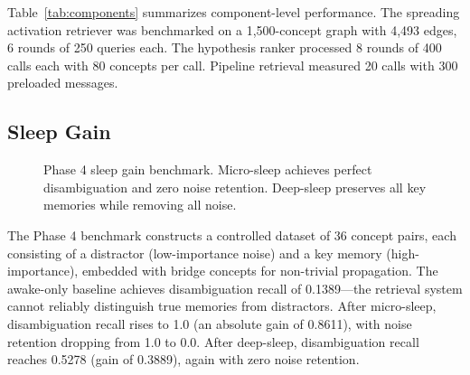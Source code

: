 \documentclass[11pt,twocolumn]{article}
\begin{document}
Table~\ref{tab:components} summarizes component-level performance. The spreading activation retriever was benchmarked on a 1,500-concept graph with 4,493 edges, 6 rounds of 250 queries each. The hypothesis ranker processed 8 rounds of 400 calls each with 80 concepts per call. Pipeline retrieval measured 20 calls with 300 preloaded messages.

\subsection{Sleep Gain}

\begin{figure}[t]
\centering
{}
\caption{Phase 4 sleep gain benchmark. Micro-sleep achieves perfect disambiguation and zero noise retention. Deep-sleep preserves all key memories while removing all noise.}
\label{fig:sleep_gain}
\end{figure}

The Phase 4 benchmark constructs a controlled dataset of 36 concept pairs, each consisting of a distractor (low-importance noise) and a key memory (high-importance), embedded with bridge concepts for non-trivial propagation. The awake-only baseline achieves disambiguation recall of 0.1389---the retrieval system cannot reliably distinguish true memories from distractors. After micro-sleep, disambiguation recall rises to 1.0 (an absolute gain of 0.8611), with noise retention dropping from 1.0 to 0.0. After deep-sleep, disambiguation recall reaches 0.5278 (gain of 0.3889), again with zero noise retention.
\end{document}
